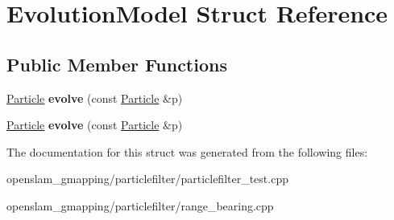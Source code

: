 \hypertarget{structEvolutionModel}{}\section{Evolution\+Model Struct Reference}
\label{structEvolutionModel}
\subsection*{Public Member Functions}
\begin{DoxyCompactItemize}
\item 
\mbox{\label{structEvolutionModel_ad94f4312e17327467ba0a705c0d52e2c}} 
\hyperlink{structParticle}{Particle} {\bfseries evolve} (const \hyperlink{structParticle}{Particle} \&p)
\item 
\mbox{\label{structEvolutionModel_ad94f4312e17327467ba0a705c0d52e2c}} 
\hyperlink{structParticle}{Particle} {\bfseries evolve} (const \hyperlink{structParticle}{Particle} \&p)
\end{DoxyCompactItemize}


The documentation for this struct was generated from the following files\+:\begin{DoxyCompactItemize}
\item 
openslam\+\_\+gmapping/particlefilter/particlefilter\+\_\+test.\+cpp\item 
openslam\+\_\+gmapping/particlefilter/range\+\_\+bearing.\+cpp\end{DoxyCompactItemize}
